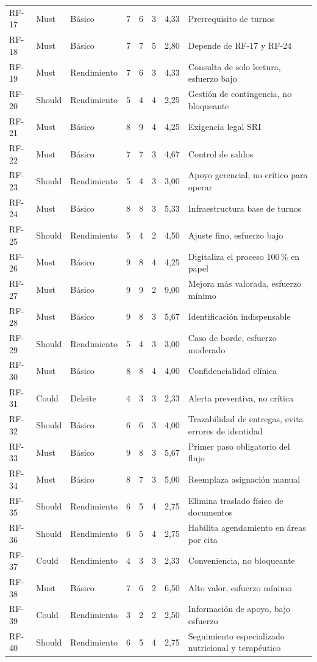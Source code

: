 \documentclass[11pt,a4paper]{article}
\begin{document}
\begin{longtable}{p{} p{} p{} p{} p{} p{} p{} p{}}
		RF-17 & Must    & Básico      & 7  & 6 & 3 & 4,33 & Prerrequisito de turnos \\
		RF-18 & Must    & Básico      & 7  & 7 & 5 & 2,80 & Depende de RF-17 y RF-24 \\
		RF-19 & Must    & Rendimiento & 7  & 6 & 3 & 4,33 & Consulta de solo lectura, esfuerzo bajo \\
		RF-20 & Should  & Rendimiento & 5  & 4 & 4 & 2,25 & Gestión de contingencia, no bloqueante \\
		RF-21 & Must    & Básico      & 8  & 9 & 4 & 4,25 & Exigencia legal SRI \\
		RF-22 & Must    & Básico      & 7  & 7 & 3 & 4,67 & Control de saldos \\
		RF-23 & Should  & Rendimiento & 5  & 4 & 3 & 3,00 & Apoyo gerencial, no crítico para operar \\
		RF-24 & Must    & Básico      & 8  & 8 & 3 & 5,33 & Infraestructura base de turnos \\
		RF-25 & Should  & Rendimiento & 5  & 4 & 2 & 4,50 & Ajuste fino, esfuerzo bajo \\
		RF-26 & Must    & Básico      & 9  & 8 & 4 & 4,25 & Digitaliza el proceso 100\,\% en papel \\
		RF-27 & Must    & Básico      & 9  & 9 & 2 & 9,00 & Mejora más valorada, esfuerzo mínimo \\
		RF-28 & Must    & Básico      & 9  & 8 & 3 & 5,67 & Identificación indispensable \\
		RF-29 & Should  & Rendimiento & 5  & 4 & 3 & 3,00 & Caso de borde, esfuerzo moderado \\
		RF-30 & Must    & Básico      & 8  & 8 & 4 & 4,00 & Confidencialidad clínica \\
		RF-31 & Could   & Deleite     & 4  & 3 & 3 & 2,33 & Alerta preventiva, no crítica \\
		RF-32 & Should  & Básico      & 6  & 6 & 3 & 4,00 & Trazabilidad de entregas, evita errores de identidad \\
		RF-33 & Must    & Básico      & 9  & 8 & 3 & 5,67 & Primer paso obligatorio del flujo \\
		RF-34 & Must    & Básico      & 8  & 7 & 3 & 5,00 & Reemplaza asignación manual \\
		RF-35 & Should  & Rendimiento & 6  & 5 & 4 & 2,75 & Elimina traslado físico de documentos \\
		RF-36 & Should  & Rendimiento & 6  & 5 & 4 & 2,75 & Habilita agendamiento en áreas por cita \\
		RF-37 & Could   & Rendimiento & 4  & 3 & 3 & 2,33 & Conveniencia, no bloqueante \\
		RF-38 & Must    & Básico      & 7  & 6 & 2 & 6,50 & Alto valor, esfuerzo mínimo \\
		RF-39 & Could   & Rendimiento & 3  & 2 & 2 & 2,50 & Información de apoyo, bajo esfuerzo \\
		RF-40 & Should  & Rendimiento & 6  & 5 & 4 & 2,75 & Seguimiento especializado nutricional y terapéutico \\
		

\end{longtable}
\end{document}

